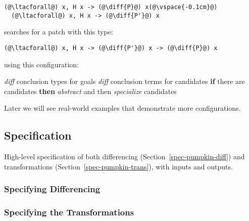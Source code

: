 \begin{lstlisting}[language=coq]
  (@\ltacforall@) x, H x -> (@\diff{P}@) x(@\vspace{-0.1cm}@)
  (@\ltacforall@) x, H x -> (@\diff{P'}@) x
\end{lstlisting}
\sysname searches for a patch with this type:

\begin{lstlisting}[language=coq]
  (@\ltacforall@) x, H x -> (@\diff{P'}@) x -> (@\diff{P}@) x
\end{lstlisting}
using this configuration:

\begin{algorithm}
\footnotesize
\begin{algorithmic}[1]
    \STATE \textit{diff} conclusion types for goals
    \STATE \textit{diff} conclusion terms for candidates
    \STATE \textbf{if} there are candidates \textbf{then}
    \STATE \hspace*{1em} \textit{abstract} and then \textit{specialize} candidates
\end{algorithmic}
\end{algorithm}

Later we will see real-world examples that demonstrate more configurations.

\subsection{Specification}
\label{sec:pumpkin-spec}

High-level specification of both differencing (Section~\ref{spec-pumpkin-diff}) and transformations (Section~\ref{spec-pumpkin-trans}), with inputs and outputs.

\subsubsection{Specifying Differencing}
\label{sec:spec-pumpkin-diff}

\subsubsection{Specifying the Transformations}
\label{sec:spec-pumpkin-trans}

